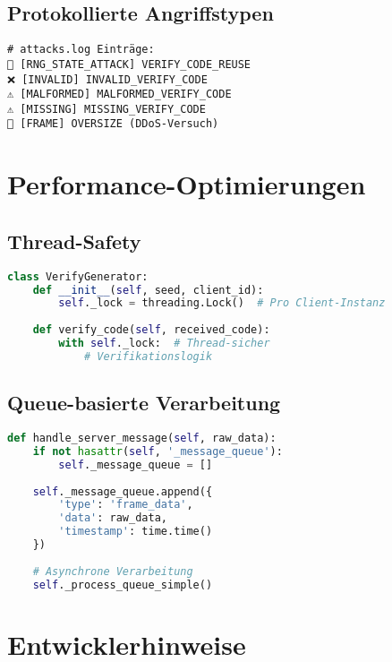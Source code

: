 \documentclass[10pt,a4paper]{article}
\begin{document}
\subsection{Protokollierte Angriffstypen}

\begin{lstlisting}[caption=Angriffsprotokoll-Beispiele]
# attacks.log Einträge:
🚨 [RNG_STATE_ATTACK] VERIFY_CODE_REUSE
❌ [INVALID] INVALID_VERIFY_CODE
⚠️ [MALFORMED] MALFORMED_VERIFY_CODE
⚠️ [MISSING] MISSING_VERIFY_CODE
📏 [FRAME] OVERSIZE (DDoS-Versuch)
\end{lstlisting}

\section{Performance-Optimierungen}

\subsection{Thread-Safety}

\begin{lstlisting}[language=Python,caption=Thread-sichere Datenstrukturen]
class VerifyGenerator:
    def __init__(self, seed, client_id):
        self._lock = threading.Lock()  # Pro Client-Instanz
    
    def verify_code(self, received_code):
        with self._lock:  # Thread-sicher
            # Verifikationslogik
\end{lstlisting}

\subsection{Queue-basierte Verarbeitung}

\begin{lstlisting}[language=Python,caption=Nachrichten-Queue]
def handle_server_message(self, raw_data):
    if not hasattr(self, '_message_queue'):
        self._message_queue = []
    
    self._message_queue.append({
        'type': 'frame_data',
        'data': raw_data,
        'timestamp': time.time()
    })
    
    # Asynchrone Verarbeitung
    self._process_queue_simple()
\end{lstlisting}

\section{Entwicklerhinweise}
\end{document}
